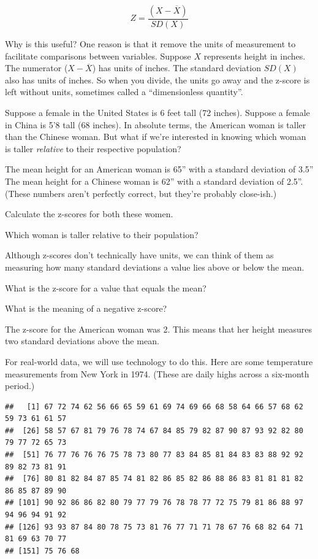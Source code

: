 \documentclass[
]{book}
\newenvironment{Shaded}{\begin{snugshade}}{\end{snugshade}}
\newcommand{\NormalTok}[1]{#1}
\newcommand{\SpecialCharTok}[1]{\textcolor[rgb]{0.00,0.00,0.00}{#1}}
\begin{document}
\[
Z = \frac{\left(X - \overline{X}\right)}{SD(X)}
\]

Why is this useful? One reason is that it remove the units of measurement to facilitate comparisons between variables. Suppose \(X\) represents height in inches. The numerator (\(X - \overline{X}\)) has units of inches. The standard deviation \(SD(X)\) also has units of inches. So when you divide, the units go away and the z-score is left without units, sometimes called a ``dimensionless quantity''.

Suppose a female in the United States is 6 feet tall (72 inches). Suppose a female in China is 5'8 tall (68 inches). In absolute terms, the American woman is taller than the Chinese woman. But what if we're interested in knowing which woman is taller \emph{relative} to their respective population?

The mean height for an American woman is 65'' with a standard deviation of 3.5'' The mean height for a Chinese woman is 62'' with a standard deviation of 2.5''. (These numbers aren't perfectly correct, but they're probably close-ish.)

Calculate the z-scores for both these women.

Which woman is taller relative to their population?

Although z-scores don't technically have units, we can think of them as measuring how many standard deviations a value lies above or below the mean.

What is the z-score for a value that equals the mean?

What is the meaning of a negative z-score?

The z-score for the American woman was 2. This means that her height measures two standard deviations above the mean.

For real-world data, we will use technology to do this. Here are some temperature measurements from New York in 1974. (These are daily highs across a six-month period.)

\begin{Shaded}
\end{Shaded}

\begin{verbatim}
##   [1] 67 72 74 62 56 66 65 59 61 69 74 69 66 68 58 64 66 57 68 62 59 73 61 61 57
##  [26] 58 57 67 81 79 76 78 74 67 84 85 79 82 87 90 87 93 92 82 80 79 77 72 65 73
##  [51] 76 77 76 76 76 75 78 73 80 77 83 84 85 81 84 83 83 88 92 92 89 82 73 81 91
##  [76] 80 81 82 84 87 85 74 81 82 86 85 82 86 88 86 83 81 81 81 82 86 85 87 89 90
## [101] 90 92 86 86 82 80 79 77 79 76 78 78 77 72 75 79 81 86 88 97 94 96 94 91 92
## [126] 93 93 87 84 80 78 75 73 81 76 77 71 71 78 67 76 68 82 64 71 81 69 63 70 77
## [151] 75 76 68
\end{verbatim}
\end{document}
